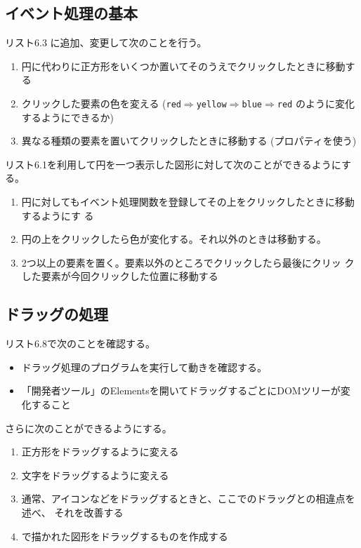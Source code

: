 \documentclass[a4j]{jarticle}
\begin{document}
 \subsection{イベント処理の基本}
 リスト6.3 に追加、変更して次のことを行う。
  \begin{enumerate}
   \item 円に代わりに正方形をいくつか置いてそのうえでクリックしたときに移動する
   \item クリックした要素の色を変える
         (\texttt{red}$\Rightarrow$\texttt{yellow}$\Rightarrow$\texttt{blue}$\Rightarrow$\texttt{red}
         のように変化するようにできるか)
   \item 異なる種類の要素を置いてクリックしたときに移動する
         (プロパティを使う)
  \end{enumerate}
リスト6.1を利用して円を一つ表示した図形に対して次のことができるようにする。
\begin{enumerate}
  \item 円に対してもイベント処理関数を登録してその上をクリックしたときに移動するようにす
        る
  \item 円の上をクリックしたら色が変化する。それ以外のときは移動する。
  \item 2つ以上の要素を置く。要素以外のところでクリックしたら最後にクリッ
        クした要素が今回クリックした位置に移動する
\end{enumerate}
\subsection{ドラッグの処理}
リスト6.8で次のことを確認する。
\begin{itemize}
 \item ドラッグ処理のプログラムを実行して動きを確認する。
 \item 「開発者ツール」のElementsを開いてドラッグするごとにDOMツリーが変
       化すること
\end{itemize}
さらに次のことができるようにする。
\begin{enumerate}
 \item 正方形をドラッグするように変える
 \item 文字をドラッグするように変える
 \item 通常、アイコンなどをドラッグするときと、ここでのドラッグとの相違点を述べ、
			 それを改善する
 \item {}で描かれた図形をドラッグするものを作成する
\end{enumerate}
\end{document}
